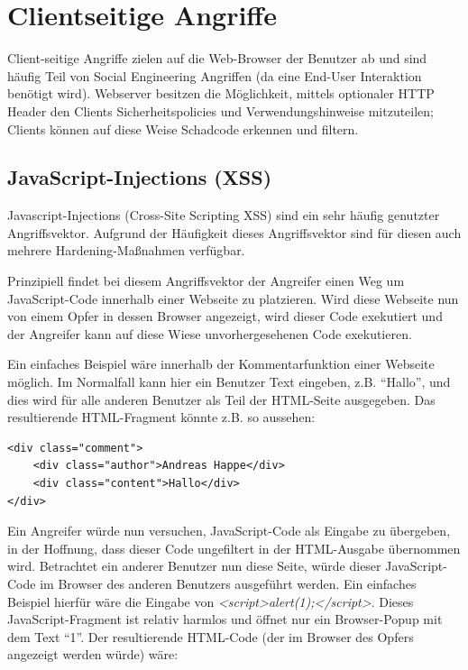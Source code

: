 \chapter{Clientseitige Angriffe}

Client-seitige Angriffe zielen auf die Web-Browser der Benutzer ab und sind häufig Teil von Social Engineering Angriffen (da eine End-User Interaktion benötigt wird). Webserver besitzen die Möglichkeit, mittels optionaler HTTP Header den Clients Sicherheitspolicies und Verwendungshinweise mitzuteilen; Clients können auf diese Weise Schadcode erkennen und filtern.

\section{JavaScript-Injections (XSS)}
\label{xss}

Javascript-Injections (Cross-Site Scripting XSS) sind ein sehr häufig genutzter Angriffsvektor. Aufgrund der Häufigkeit dieses Angriffsvektor sind für diesen auch mehrere Hardening-Maßnahmen verfügbar.

Prinzipiell findet bei diesem Angriffsvektor der Angreifer einen Weg um JavaScript-Code innerhalb einer Webseite zu platzieren. Wird diese Webseite nun von einem Opfer in dessen Browser angezeigt, wird dieser Code exekutiert und der Angreifer kann auf diese Wiese unvorhergesehenen Code exekutieren.

Ein einfaches Beispiel wäre innerhalb der Kommentarfunktion einer Webseite möglich. Im Normalfall kann hier ein Benutzer Text eingeben, z.B. ``Hallo'', und dies wird für alle anderen Benutzer als Teil der HTML-Seite ausgegeben. Das resultierende HTML-Fragment könnte z.B. so aussehen:

\begin{verbatim}
<div class="comment">
	<div class="author">Andreas Happe</div>
	<div class="content">Hallo</div>
</div>
\end{verbatim}

Ein Angreifer würde nun versuchen, JavaScript-Code als Eingabe zu übergeben, in der Hoffnung, dass dieser Code ungefiltert in der HTML-Ausgabe übernommen wird. Betrachtet ein anderer Benutzer nun diese Seite, würde dieser JavaScript-Code im Browser des anderen Benutzers ausgeführt werden. Ein einfaches Beispiel hierfür wäre die Eingabe von \textit{<script>alert(1);</script>}. Dieses JavaScript-Fragment ist relativ harmlos und öffnet nur ein Browser-Popup mit dem Text ``1''. Der resultierende HTML-Code (der im Browser des Opfers angezeigt werden würde) wäre:

